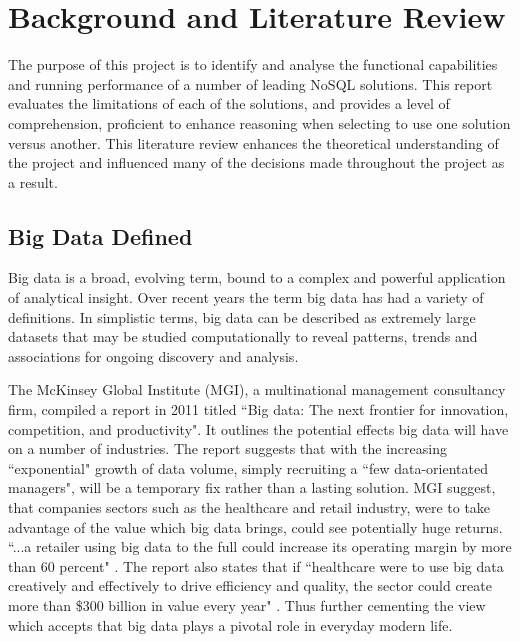 \chapter{Background and Literature Review}
The purpose of this project is to identify and analyse the functional capabilities and running performance of a number of leading NoSQL solutions. This report evaluates the limitations of each of the solutions, and provides a level of comprehension, proficient to enhance reasoning when selecting to use one solution versus another. This literature review enhances the theoretical understanding of the project and influenced many of the decisions made throughout the project as a result.

\section{Big Data Defined}\label{bigdata}
Big data is a broad, evolving term, bound to a complex and powerful application of analytical insight. Over recent years the term big data has had a variety of definitions. In simplistic terms, big data can be described as extremely large datasets that may be studied computationally to reveal patterns, trends and associations for ongoing discovery and analysis.

The McKinsey Global Institute (MGI), a multinational management consultancy firm, compiled a report in 2011 titled ``Big data: The next frontier for innovation, competition, and productivity". It outlines the potential effects big data will have on a number of industries. The report suggests that with the increasing ``exponential" growth of data volume, simply recruiting a ``few data-orientated managers", will be a temporary fix rather than a lasting solution. MGI suggest, that companies sectors such as the healthcare and retail industry, were to take advantage of the value which big data brings, could see potentially huge returns. ``...a retailer using big data to the full could increase its operating margin by more than 60 percent" \cite{mckinskey}. The report also states that if ``healthcare were to use big data creatively and effectively to drive efficiency and quality, the sector could create more than \$300 billion in value every year" \cite{mckinskey}. Thus further cementing the view which accepts that big data plays a pivotal role in everyday modern life.

